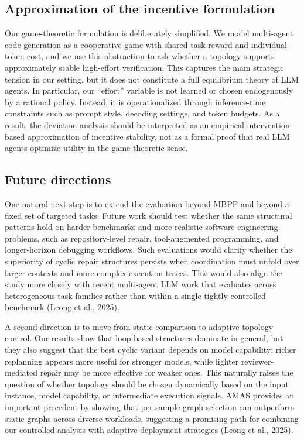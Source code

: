 \documentclass[manuscript,screen,review]{acmart}
\begin{document}
\subsection{Approximation of the incentive formulation}

Our game-theoretic formulation is deliberately simplified. We model multi-agent code generation as a cooperative game with shared task reward and individual token cost, and we use this abstraction to ask whether a topology supports approximately stable high-effort verification. This captures the main strategic tension in our setting, but it does not constitute a full equilibrium theory of LLM agents. In particular, our “effort” variable is not learned or chosen endogenously by a rational policy. Instead, it is operationalized through inference-time constraints such as prompt style, decoding settings, and token budgets. As a result, the deviation analysis should be interpreted as an empirical intervention-based approximation of incentive stability, not as a formal proof that real LLM agents optimize utility in the game-theoretic sense.

\subsection{Future directions}

One natural next step is to extend the evaluation beyond MBPP and beyond a fixed set of targeted tasks. Future work should test whether the same structural patterns hold on harder benchmarks and more realistic software engineering problems, such as repository-level repair, tool-augmented programming, and longer-horizon debugging workflows. Such evaluations would clarify whether the superiority of cyclic repair structures persists when coordination must unfold over larger contexts and more complex execution traces. This would also align the study more closely with recent multi-agent LLM work that evaluates across heterogeneous task families rather than within a single tightly controlled benchmark (Leong et al., 2025).

A second direction is to move from static comparison to adaptive topology control. Our results show that loop-based structures dominate in general, but they also suggest that the best cyclic variant depends on model capability: richer replanning appears more useful for stronger models, while lighter reviewer-mediated repair may be more effective for weaker ones. This naturally raises the question of whether topology should be chosen dynamically based on the input instance, model capability, or intermediate execution signals. AMAS provides an important precedent by showing that per-sample graph selection can outperform static graphs across diverse workloads, suggesting a promising path for combining our controlled analysis with adaptive deployment strategies (Leong et al., 2025).
\end{document}
